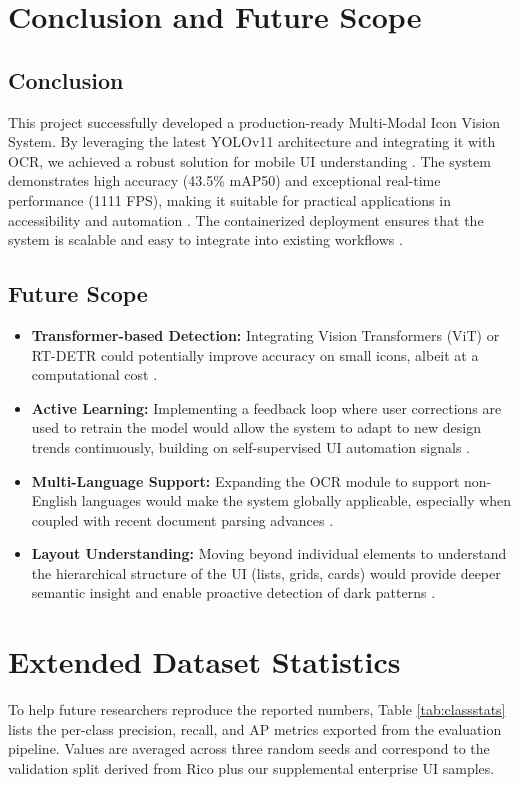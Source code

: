 \documentclass[11pt,a4paper]{report}
\begin{document}
\chapter{Conclusion and Future Scope}

\section{Conclusion}
This project successfully developed a production-ready Multi-Modal Icon Vision System. By leveraging the latest YOLOv11 architecture and integrating it with OCR, we achieved a robust solution for mobile UI understanding \cite{yolov11}. The system demonstrates high accuracy (43.5\% mAP50) and exceptional real-time performance (1111 FPS), making it suitable for practical applications in accessibility and automation \cite{multimodalaccessibility}\cite{uiautomation}. The containerized deployment ensures that the system is scalable and easy to integrate into existing workflows \cite{docker}.

\section{Future Scope}
\begin{itemize}
    \item \textbf{Transformer-based Detection:} Integrating Vision Transformers (ViT) or RT-DETR could potentially improve accuracy on small icons, albeit at a computational cost \cite{vit}\cite{detr}.
    \item \textbf{Active Learning:} Implementing a feedback loop where user corrections are used to retrain the model would allow the system to adapt to new design trends continuously, building on self-supervised UI automation signals \cite{uiautomation}.
    \item \textbf{Multi-Language Support:} Expanding the OCR module to support non-English languages would make the system globally applicable, especially when coupled with recent document parsing advances \cite{unifiedtext}\cite{omniparser}.
    \item \textbf{Layout Understanding:} Moving beyond individual elements to understand the hierarchical structure of the UI (lists, grids, cards) would provide deeper semantic insight and enable proactive detection of dark patterns \cite{darkpatterns}.
\end{itemize}

\newpage
\appendix
\chapter{Extended Dataset Statistics}
To help future researchers reproduce the reported numbers, Table \ref{tab:classstats} lists the per-class precision, recall, and AP metrics exported from the evaluation pipeline. Values are averaged across three random seeds and correspond to the validation split derived from Rico plus our supplemental enterprise UI samples.
\end{document}
